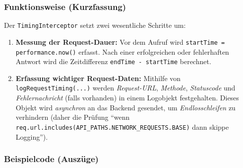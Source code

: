 \documentclass[12pt,oneside]{article}
\begin{document}
\subsubsection{Funktionsweise (Kurzfassung)}
Der \lstinline|TimingInterceptor| setzt zwei wesentliche Schritte um:
\begin{enumerate}
  \item \textbf{Messung der Request-Dauer:} Vor dem Aufruf wird \lstinline|startTime = performance.now()| erfasst. Nach einer erfolgreichen oder fehlerhaften Antwort wird die Zeitdifferenz \lstinline|endTime - startTime| berechnet.
  \item \textbf{Erfassung wichtiger Request-Daten:} Mithilfe von \lstinline|logRequestTiming(...)| werden \emph{Request-URL}, \emph{Methode}, \emph{Statuscode} und \emph{Fehlernachricht} (falls vorhanden) in einem Logobjekt festgehalten. Dieses Objekt wird \emph{asynchron} an das Backend gesendet, um \emph{Endlosschleifen} zu verhindern (daher die Prüfung \enquote{wenn \lstinline|req.url.includes(API_PATHS.NETWORK_REQUESTS.BASE)| dann skippe Logging}).
\end{enumerate}

\subsubsection{Beispielcode (Auszüge)}
 
\end{document}
